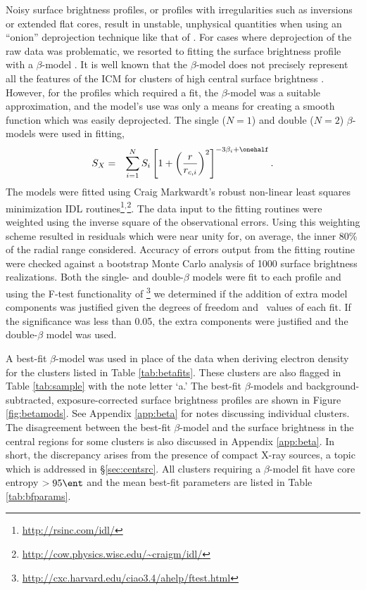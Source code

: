 \documentclass{emulateapj}
\begin{document}
Noisy surface brightness profiles, or profiles with irregularities
such as inversions or extended flat cores, result in unstable,
unphysical quantities when using an ``onion'' deprojection technique
like that of \citet{kriss83}. For cases where deprojection of the raw
data was problematic, we resorted to fitting the surface brightness
profile with a $\beta$-model \citep{1978A&A....70..677C}. It is well
known that the $\beta$-model does not precisely represent all the
features of the ICM for clusters of high central surface brightness
\citep{2000MNRAS.311..313E, 2002ApJ...579..571L,
2007ApJ...665..911H}. However, for the profiles which required a fit,
the $\beta$-model was a suitable approximation, and the model's use was
only a means for creating a smooth function which was easily
deprojected. The single ($N=1$) and double ($N=2$) $\beta$-models were
used in fitting,
\begin{eqnarray}
S_X &=& \displaystyle\sum_{i=1}^N S_i
\left[1+\left(\frac{r}{r_{c,i}}\right)^2\right]^{-3\beta_i+\onehalf}.
\end{eqnarray}
The models were fitted using Craig Markwardt's robust non-linear least
squares minimization IDL
routines\footnote{\url{http://rsinc.com/idl/}}$^{,}$\footnote{\url{http://cow.physics.wisc.edu/~craigm/idl/}}. The
data input to the fitting routines were weighted using the inverse
square of the observational errors. Using this weighting scheme
resulted in residuals which were near unity for, on average, the inner
80\% of the radial range considered. Accuracy of errors output from
the fitting routine were checked against a bootstrap Monte Carlo
analysis of 1000 surface brightness realizations. Both the single- and
double-$\beta$ models were fit to each profile and using the F-test
functionality of
\sherpa\footnote{\url{http://cxc.harvard.edu/ciao3.4/ahelp/ftest.html}}
we determined if the addition of extra model components was justified
given the degrees of freedom and \chisq\ values of each fit. If the
significance was less than 0.05, the extra components were justified
and the double-$\beta$ model was used.

A best-fit $\beta$-model was used in place of the data when deriving
electron density for the clusters listed in Table
\ref{tab:betafits}. These clusters are also flagged in Table
\ref{tab:sample} with the note letter `a.' The best-fit $\beta$-models
and background-subtracted, exposure-corrected surface brightness
profiles are shown in Figure \ref{fig:betamods}. See Appendix
\ref{app:beta} for notes discussing individual clusters. The
disagreement between the best-fit $\beta$-model and the surface
brightness in the central regions for some clusters is also discussed
in Appendix \ref{app:beta}. In short, the discrepancy arises from the
presence of compact X-ray sources, a topic which is addressed in
\S\ref{sec:centsrc}. All clusters requiring a $\beta$-model fit have
core entropy $> 95 \ent$ and the mean best-fit parameters are listed
in Table \ref{tab:bfparams}.
\end{document}
